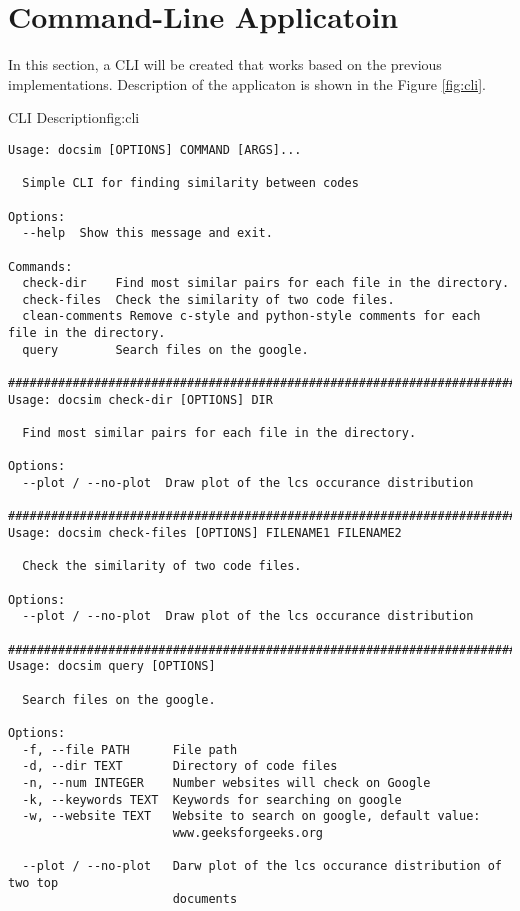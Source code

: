 \section{Command-Line Applicatoin}
In this section, a CLI will be created that works based on the previous
implementations. Description of the applicaton is shown in the Figure \ref{fig:cli}.

\begin{fig-shaded}{CLI Description}{fig:cli}
\begin{lstlisting}[style=BASH, style=mystyle]
Usage: docsim [OPTIONS] COMMAND [ARGS]...

  Simple CLI for finding similarity between codes

Options:
  --help  Show this message and exit.

Commands:
  check-dir    Find most similar pairs for each file in the directory.
  check-files  Check the similarity of two code files.
  clean-comments Remove c-style and python-style comments for each file in the directory.
  query        Search files on the google.

##############################################################################
Usage: docsim check-dir [OPTIONS] DIR

  Find most similar pairs for each file in the directory.

Options:
  --plot / --no-plot  Draw plot of the lcs occurance distribution

##############################################################################
Usage: docsim check-files [OPTIONS] FILENAME1 FILENAME2

  Check the similarity of two code files.

Options:
  --plot / --no-plot  Draw plot of the lcs occurance distribution

##############################################################################
Usage: docsim query [OPTIONS]

  Search files on the google.

Options:
  -f, --file PATH      File path
  -d, --dir TEXT       Directory of code files
  -n, --num INTEGER    Number websites will check on Google
  -k, --keywords TEXT  Keywords for searching on google
  -w, --website TEXT   Website to search on google, default value:
                       www.geeksforgeeks.org

  --plot / --no-plot   Darw plot of the lcs occurance distribution of two top
                       documents

\end{lstlisting}
\end{fig-shaded}

